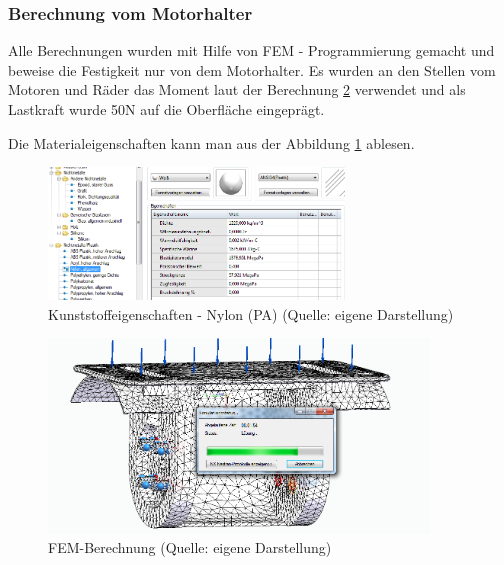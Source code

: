 \subsubsection{ Berechnung vom Motorhalter}
Alle Berechnungen wurden mit Hilfe von FEM - Programmierung gemacht und beweise die Festigkeit nur von dem Motorhalter. Es wurden an den Stellen vom Motoren und Räder das Moment laut der Berechnung \ref{FEM1} verwendet und als Lastkraft wurde 50N auf die Oberfläche eingeprägt.

Die Materialeigenschaften kann man aus der Abbildung \ref{FEM2} ablesen.

\begin{figure}[!h]  %
	\centering\includegraphics[width=0.7\textwidth]{images/FEM2.png}
	\caption{Kunststoffeigenschaften - Nylon (PA) \newline (Quelle: eigene Darstellung)}
	\label{FEM2} %
\end{figure}
\begin{figure}[!h]  %
	\centering\includegraphics[width=0.9\textwidth]{images/FEM.png}
	\caption{FEM-Berechnung \newline (Quelle: eigene Darstellung)}
	\label{FEM1} %
\end{figure}
